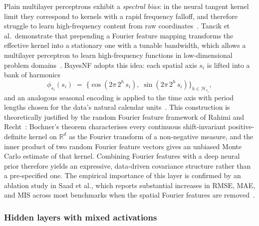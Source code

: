 Plain multilayer perceptrons exhibit a \emph{spectral bias}: in the
neural tangent kernel limit they correspond to kernels with a rapid
frequency falloff, and therefore struggle to learn high-frequency
content from raw coordinates~\cite{tancik2020fourier}. Tancik et al.\
demonstrate that prepending a Fourier feature mapping transforms the
effective kernel into a stationary one with a tunable bandwidth, which
allows a multilayer perceptron to learn high-frequency functions in
low-dimensional problem domains~\cite{tancik2020fourier}. BayesNF adopts
this idea: each spatial axis $s_i$ is lifted into a bank of harmonics
\begin{equation}
  \phi_{s_i}(s_i) \;=\;
    \bigl\{\cos(2\pi\, 2^h\, s_i),\;\sin(2\pi\, 2^h\, s_i)\bigr\}_{h\in\mathcal{H}_{s_i}},
  \label{eq:bnf-spatial-fourier}
\end{equation}
and an analogous seasonal encoding is applied to the time axis with
period lengths chosen for the data's natural calendar
units~\cite{saad2024bnf}. This construction is theoretically justified
by the random Fourier feature framework of Rahimi and
Recht~\cite{rahimi2007rff}: Bochner's theorem characterises every
continuous shift-invariant positive-definite kernel on $\mathbb{R}^d$
as the Fourier transform of a non-negative measure, and the inner
product of two random Fourier feature vectors gives an unbiased Monte
Carlo estimate of that kernel. Combining Fourier features with a deep
neural prior therefore yields an expressive, data-driven covariance
structure rather than a pre-specified one. The empirical importance of
this layer is confirmed by an ablation study in Saad et al., which
reports substantial increases in RMSE, MAE, and MIS across most
benchmarks when the spatial Fourier features are
removed~\cite{saad2024bnf}.

\subsubsection*{Hidden layers with mixed activations}


